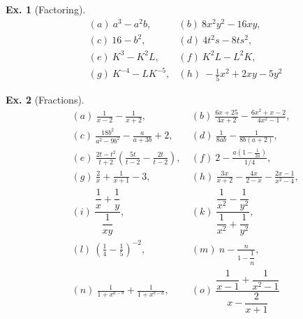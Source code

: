 \documentclass[10pt,a4paper]{book}
\theoremstyle{definition}\newtheorem{definition}{Definition}
\theoremstyle{definition}\newtheorem{fact}{Fact}
\theoremstyle{definition}\newtheorem{ex}{Ex.}
\theoremstyle{definition}\newtheorem{project}{Project}
\theoremstyle{definition}\newtheorem{problem}{Problem}
\theoremstyle{definition}\newtheorem{example}{Example}
\numberwithin{theorem}{chapter}
\numberwithin{corollary}{chapter}
\numberwithin{assumption}{chapter}
\numberwithin{definition}{chapter}
\numberwithin{prop}{chapter}
\numberwithin{notation}{chapter}
\numberwithin{problem}{chapter}
\numberwithin{example}{chapter}
\numberwithin{fact}{chapter}
\numberwithin{ex}{chapter}
\begin{document}
	\begin{ex}[Factoring]
		\begin{align*}
			& (a) \ a^3 - a^2 b, \                  
			& (b) \ 8 x^2 y^2 - 16 xy,              \\
			& (c) \ 16 - b^2, \                     
			& (d) \ 4t^2 s - 8 t s^2,               \\
			& (e) \ K^3 - K^2 L, \                  
			& (f) \ K^2 L - L^2 K,                  \\
			& (g) \ K^{-4} - L K^{-5},              
			& (h) \ -\frac{1}{5} x^2 + 2 xy - 5 y^2 
		\end{align*}
	\end{ex}
	
	\begin{ex}[Fractions]
		\begin{align*}
			& (a) \ \frac{1}{x-2} - \frac{1}{x+2},                                             
			& (b) \ \frac{6x + 25}{4x+2} - \frac{6x^2 + x - 2}{4x^2 - 1},                      \\
			& (c) \ \frac{18b^2}{a^2 - 9b^2} - \frac{a}{a+3b} + 2,                             
			& (d) \ \frac{1}{8ab} - \frac{1}{8b(a+2)},                                         \\
			& (e) \ \frac{2t - t^2}{t+2} \left(\frac{5t}{t-2} - \frac{2t}{t-2}\right), \       
			& (f) \ 2 - \frac{a(1-\frac{1}{2a})}{1/4},                                         \\
			& (g) \ \frac{2}{x} + \frac{1}{x+1} - 3, \                                         
			& (h) \ \frac{3x}{x+2} - \frac{4x}{2-x} - \frac{2x-1}{x^2 - 4},                    \\
			& (i) \ \dfrac{\dfrac{1}{x} + \dfrac{1}{y}}{\dfrac{1}{xy}}, \                      
			& (k) \ \dfrac{\dfrac{1}{x^2} - \dfrac{1}{y^2} }{\dfrac{1}{x^2} + \dfrac{1}{y^2}}, \\
			& (l) \ \left( \frac{1}{4} - \frac{1}{5} \right)^{-2},                             
			& (m) \ n - \frac{n}{1 - \dfrac{1}{n}},                                            \\
			& (n) \ \frac{1}{1+ x^{a-b}} + \frac{1}{1+ x^{b-a}},                               
			& (o) \ \dfrac{\dfrac{1}{x-1} + \dfrac{1}{x^2 - 1}}{x - \dfrac{2}{x+1}}            
		\end{align*}
	\end{ex}
	
\end{document}
